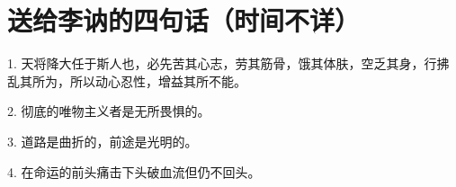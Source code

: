 \section[送给李讷的四句话（时间不详）]{送给李讷的四句话（时间不详）}


1. 天将降大任于斯人也，必先苦其心志，劳其筋骨，饿其体肤，空乏其身，行拂乱其所为，所以动心忍性，增益其所不能。

2. 彻底的唯物主义者是无所畏惧的。

3. 道路是曲折的，前途是光明的。

4. 在命运的前头痛击下头破血流但仍不回头。

